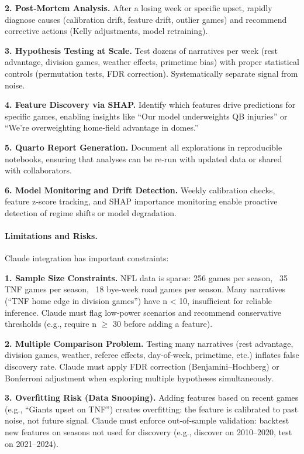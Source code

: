\textbf{2. Post‑Mortem Analysis.} After a losing week or specific upset, rapidly diagnose causes (calibration drift, feature drift, outlier games) and recommend corrective actions (Kelly adjustments, model retraining).

\textbf{3. Hypothesis Testing at Scale.} Test dozens of narratives per week (rest advantage, division games, weather effects, primetime bias) with proper statistical controls (permutation tests, FDR correction). Systematically separate signal from noise.

\textbf{4. Feature Discovery via SHAP.} Identify which features drive predictions for specific games, enabling insights like ``Our model underweights QB injuries'' or ``We're overweighting home‑field advantage in domes.''

\textbf{5. Quarto Report Generation.} Document all explorations in reproducible notebooks, ensuring that analyses can be re‑run with updated data or shared with collaborators.

\textbf{6. Model Monitoring and Drift Detection.} Weekly calibration checks, feature z‑score tracking, and SHAP importance monitoring enable proactive detection of regime shifts or model degradation.

\paragraph{Limitations and Risks.}
Claude integration has important constraints:

\textbf{1. Sample Size Constraints.} NFL data is sparse: 256 games per season, ~35 TNF games per season, ~18 bye‑week road games per season. Many narratives (``TNF home edge in division games'') have n < 10, insufficient for reliable inference. Claude must flag low‑power scenarios and recommend conservative thresholds (e.g., require n $\geq$ 30 before adding a feature).

\textbf{2. Multiple Comparison Problem.} Testing many narratives (rest advantage, division games, weather, referee effects, day‑of‑week, primetime, etc.) inflates false discovery rate. Claude must apply FDR correction (Benjamini--Hochberg) or Bonferroni adjustment when exploring multiple hypotheses simultaneously.

\textbf{3. Overfitting Risk (Data Snooping).} Adding features based on recent games (e.g., ``Giants upset on TNF'') creates overfitting: the feature is calibrated to past noise, not future signal. Claude must enforce out‑of‑sample validation: backtest new features on seasons not used for discovery (e.g., discover on 2010--2020, test on 2021--2024).

